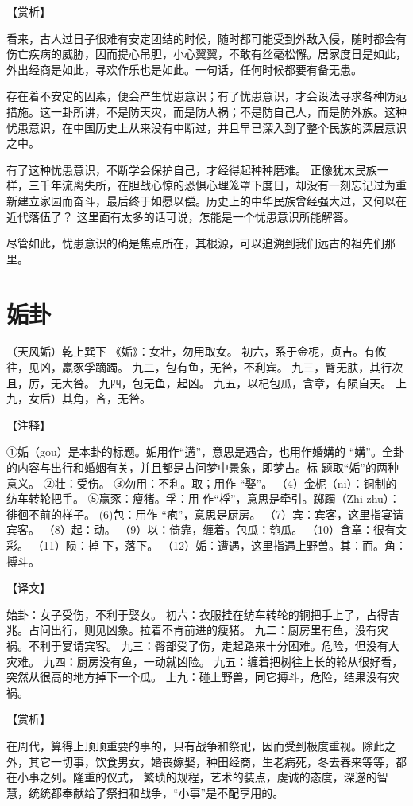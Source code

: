 \documentclass[12pt,UTF8]{ctexbook}
\begin{document}
【赏析】

看来，古人过日子很难有安定团结的时候，随时都可能受到外敌入侵，随时都会有伤亡疾病的威胁，因而提心吊胆，小心翼翼，不敢有丝毫松懈。居家度日是如此，外出经商是如此，寻欢作乐也是如此。一句话，任何时候都要有备无患。

存在着不安定的因素，便会产生忧患意识；有了忧患意识，才会设法寻求各种防范措施。这一卦所讲，不是防天灾，而是防人祸；不是防自己人，而是防外族。这种忧患意识，在中国历史上从来没有中断过，并且早已深入到了整个民族的深层意识之中。

有了这种忧患意识，不断学会保护自己，才经得起种种磨难。 正像犹太民族一样，三千年流离失所，在胆战心惊的恐惧心理笼罩下度日，却没有一刻忘记过为重新建立家园而奋斗，最后终于如愿以偿。历史上的中华民族曾经强大过，又何以在近代落伍了？ 这里面有太多的话可说，怎能是一个忧患意识所能解答。

尽管如此，忧患意识的确是焦点所在，其根源，可以追溯到我们远古的祖先们那里。

\chapter{姤卦}

（天风姤）乾上巽下
《姤》：女壮，勿用取女。
初六，系于金柅，贞吉。有攸往，见凶，羸豕孚蹢躅。
九二，包有鱼，无咎，不利宾。
九三，臀无肤，其行次且，厉，无大咎。
九四，包无鱼，起凶。
九五，以杞包瓜，含章，有陨自天。
上九，女后）其角，吝，无咎。

【注释】

①姤（gou）是本卦的标题。姤用作“遘”，意思是遇合，也用作婚媾的 “媾”。全卦的内容与出行和婚姻有关，并且都是占问梦中景象，即梦占。标 题取“姤”的两种意义。
②壮：受伤。
③勿用：不利。取；用作 “娶”。
（4）金柅（ni）：铜制的纺车转轮把手。
⑤赢豕：瘦猪。孚：用 作“桴”，意思是牵引。踯躅（Zhi zhu）：徘徊不前的样子。
(6)包：用作 “疱”，意思是厨房。
（7）宾：宾客，这里指宴请宾客。
（8）起：动。
（9）以：倚靠，缠着。包瓜：匏瓜。
（10）含章：很有文彩。
（11）陨：掉 下，落下。
（12）姤：遭遇，这里指遇上野兽。其：而。角：搏斗。

【译文】

始卦：女子受伤，不利于娶女。
初六：衣服挂在纺车转轮的铜把手上了，占得吉兆。占问出行，则见凶象。拉着不肯前进的瘦猪。
九二：厨房里有鱼，没有灾祸。不利于宴请宾客。
九三：臀部受了伤，走起路来十分困难。危险，但没有大灾难。
九四：厨房没有鱼，一动就凶险。
九五：缠着把树往上长的轮从很好看，突然从很高的地方掉下一个瓜。
上九：碰上野兽，同它搏斗，危险，结果没有灾祸。

【赏析】

在周代，算得上顶顶重要的事的，只有战争和祭祀，因而受到极度重视。除此之外，其它一切事，饮食男女，婚丧嫁娶，种田经商，生老病死，冬去春来等等，都在小事之列。隆重的仪式， 繁琐的规程，艺术的装点，虔诚的态度，深遂的智慧，统统都奉献给了祭扫和战争，“小事”是不配享用的。
\end{document}
